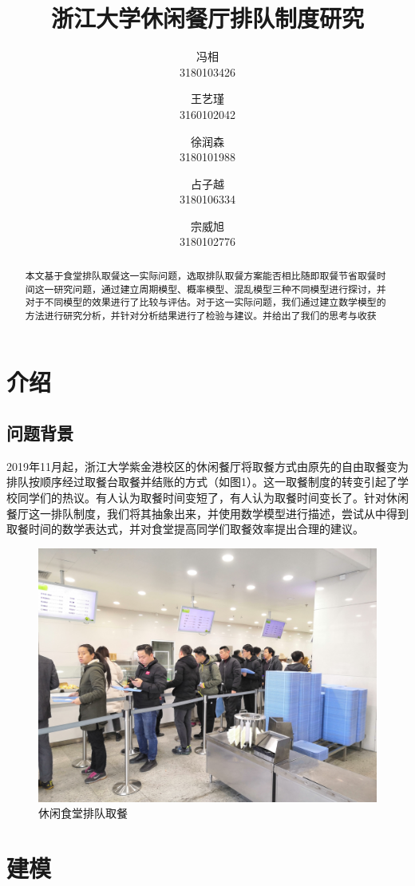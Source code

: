 \documentclass[lang=cn,10pt,a4paper]{elegantpaper}
\title{浙江大学休闲餐厅排队制度研究}
\author{冯相 \\3180103426 \and 王艺瑾 \\3160102042 \and 徐润森 \\3180101988 \and 占子越 \\3180106334 \and 宗威旭 \\3180102776}
\institute{浙江大学}
\date{\zhtoday}
\begin{document}
\maketitle

\begin{abstract}
本文基于食堂排队取餐这一实际问题，选取排队取餐方案能否相比随即取餐节省取餐时间这一研究问题，通过建立周期模型、概率模型、混乱模型三种不同模型进行探讨，并对于不同模型的效果进行了比较与评估。对于这一实际问题，我们通过建立数学模型的方法进行研究分析，并针对分析结果进行了检验与建议。并给出了我们的思考与收获
\end{abstract}

\section{介绍}
\subsection{问题背景}
2019年11月起，浙江大学紫金港校区的休闲餐厅将取餐方式由原先的自由取餐变为排队按顺序经过取餐台取餐并结账的方式（如图1）。这一取餐制度的转变引起了学校同学们的热议。有人认为取餐时间变短了，有人认为取餐时间变长了。针对休闲餐厅这一排队制度，我们将其抽象出来，并使用数学模型进行描述，尝试从中得到取餐时间的数学表达式，并对食堂提高同学们取餐效率提出合理的建议。\\
\begin{figure}[htbp]
  \centering
  \includegraphics[scale=0.07]{./image/pic1.jpg}
  \caption{休闲食堂排队取餐}
\end{figure}
\section{建模}
\end{document}
